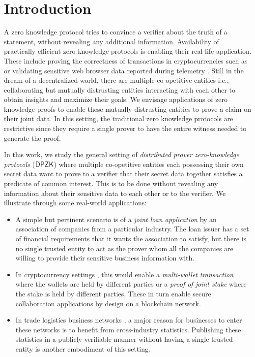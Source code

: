 \section{Introduction} \label{sec:intro}
A zero knowledge protocol tries to convince a verifier about the truth of a
statement, without revealing any additional information. Availability of
practically efficient zero knowledge protocols is enabling their real-life
application. These include proving the correctness of
transactions in cryptocurrencies such as \cite{zerocash} or validating sensitive web browser data reported during
telemetry \cite{MozillaPrio}. Still in the dream of a decentralized world, there are
multiple co-opetitive entities i.e.,
collaborating but mutually distrusting entities interacting with each other to obtain insights
and maximize their goals. We envisage applications of zero knowledge
proofs to enable these mutually
distrusting entities to prove a claim on their joint data. In this setting, the 
traditional zero knowledge protocols are restrictive since they require
a single prover to have the entire witness needed to generate the proof. 

In this work, we study the general setting of \textit{distributed prover
zero-knowledge protocols} ($\mathsf{DPZK}$) where multiple co-opetitive entities each possessing their own secret
data want to prove to a verifier that their secret data together satisfies a
predicate of common interest. This is to be done without revealing any information
about their sensitive data to each other or to the verifier. We illustrate
through some  real-world applications: %
\begin{itemize}
\item A simple but pertinent scenario is of a \textit{joint loan application} by an association of companies from a particular industry. The loan issuer has a set of financial requirements that it wants the association to satisfy, but there is no single trusted entity to act as the prover whom all the companies are willing to provide their sensitive business information with.
\item In cryptocurrency settings \cite{bitcoin, ethereum, zerocash}, this would enable a \textit{multi-wallet transaction} where the wallets are held by different parties or a \textit{proof of joint stake} where the stake is held by different parties. These in turn enable secure collaboration applications by design on a blockchain network. %
\item In trade logistics business networks \cite{scbn, e2open, tradelens}, a major reason for businesses to enter these networks is to benefit from cross-industry statistics. Publishing these statistics in a publicly verifiable manner without having a single trusted entity is another embodiment of this setting.
\end{itemize}

